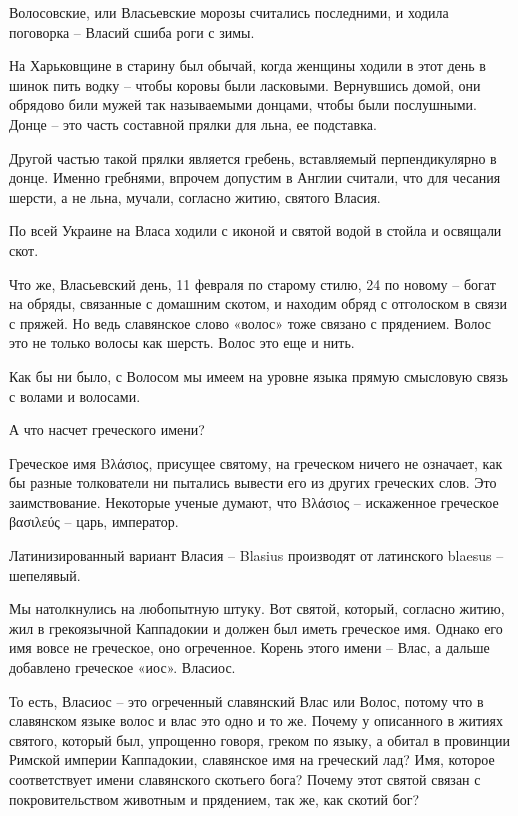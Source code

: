    Волосовские, или Власьевские морозы считались последними, и ходила поговорка – Власий сшиба роги с зимы.

   На Харьковщине в старину был обычай, когда женщины ходили в этот день в шинок пить водку – чтобы коровы были ласковыми. Вернувшись домой, они обрядово били мужей так называемыми донцами, чтобы были послушными. Донце – это часть составной прялки для льна, ее подставка.


   Другой частью такой прялки является гребень, вставляемый перпендикулярно в донце. Именно гребнями, впрочем допустим в Англии считали, что для чесания шерсти, а не льна, мучали, согласно житию, святого Власия.

   По всей Украине на Власа ходили с иконой и святой водой в стойла и освящали скот.

   Что же, Власьевский день, 11 февраля по старому стилю, 24 по новому – богат на обряды, связанные с домашним скотом, и находим обряд с отголоском в связи с пряжей. Но ведь славянское слово «волос» тоже связано с прядением. Волос это не только волосы как шерсть. Волос это еще и нить.

   Как бы ни было, с Волосом мы имеем на уровне языка прямую смысловую связь с волами и волосами.

   А что насчет греческого имени?

   Греческое имя Βλάσιος, присущее святому, на греческом ничего не означает, как бы разные толкователи ни пытались вывести его из других греческих слов. Это заимствование. Некоторые ученые думают, что Βλάσιος – искаженное греческое βασιλεύς – царь, император.

 Латинизированный вариант Власия –  Blasius производят от латинского blaesus – шепелявый.

   Мы натолкнулись на любопытную штуку. Вот святой, который, согласно житию, жил в грекоязычной Каппадокии и должен был иметь греческое имя. Однако его имя вовсе не греческое, оно огреченное. Корень этого имени – Влас, а дальше добавлено греческое «иос». Власиос.

   То есть, Власиос – это огреченный славянский Влас или Волос, потому что в славянском языке волос и влас это одно и то же. Почему у описанного в житиях святого, который был, упрощенно говоря, греком по языку, а обитал в провинции Римской империи Каппадокии, славянское имя на греческий лад? Имя, которое соответствует имени славянского скотьего бога? Почему этот святой связан с покровительством животным и прядением, так же, как скотий бог?

